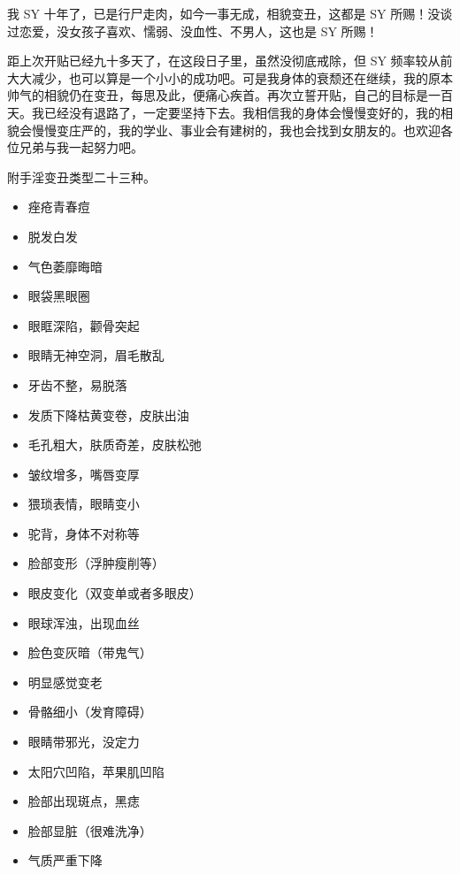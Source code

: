 \begin{case}[SY 变丑]
    我 SY 十年了，已是行尸走肉，如今一事无成，相貌变丑，这都是 SY 所赐！没谈过恋爱，没女孩子喜欢、懦弱、没血性、不男人，这也是 SY 所赐！
\end{case}

\begin{case}[SY 变丑]
    距上次开贴已经九十多天了，在这段日子里，虽然没彻底戒除，但 SY 频率较从前大大减少，也可以算是一个小小的成功吧。可是我身体的衰颓还在继续，我的原本帅气的相貌仍在变丑，每思及此，便痛心疾首。再次立誓开贴，自己的目标是一百天。我已经没有退路了，一定要坚持下去。我相信我的身体会慢慢变好的，我的相貌会慢慢变庄严的，我的学业、事业会有建树的，我也会找到女朋友的。也欢迎各位兄弟与我一起努力吧。
\end{case}

附手淫变丑类型二十三种。

\begin{adjustwidth}{-1.5em}{-1.5em}
\begin{multicols}{3}
    \begin{itemize}
        \item 痤疮青春痘
        \item 脱发白发
        \item 气色萎靡晦暗
        \item 眼袋黑眼圈
        \item 眼眶深陷，颧骨突起
        \item 眼睛无神空洞，眉毛散乱
        \item 牙齿不整，易脱落
        \item 发质下降枯黄变卷，皮肤出油
        \item 毛孔粗大，肤质奇差，皮肤松弛
        \item 皱纹增多，嘴唇变厚
        \item 猥琐表情，眼睛变小
        \item 驼背，身体不对称等
        \item 脸部变形（浮肿瘦削等）
        \item 眼皮变化（双变单或者多眼皮）
        \item 眼球浑浊，出现血丝
        \item 脸色变灰暗（带鬼气）
        \item 明显感觉变老
        \item 骨骼细小（发育障碍）
        \item 眼睛带邪光，没定力
        \item 太阳穴凹陷，苹果肌凹陷
        \item 脸部出现斑点，黑痣
        \item 脸部显脏（很难洗净）
        \item 气质严重下降
    \end{itemize}
\end{multicols}
\end{adjustwidth}


